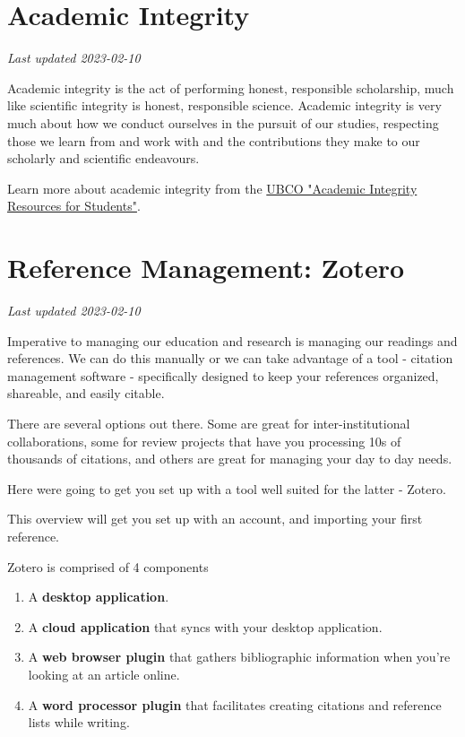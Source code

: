 \documentclass[
]{book}
\providecommand{\tightlist}{%
  \setlength{\itemsep}{0pt}\setlength{\parskip}{0pt}}
\begin{document}
\hypertarget{academic-integrity}{%
\chapter{Academic Integrity}\label{academic-integrity}}

\emph{Last updated 2023-02-10}

Academic integrity is the act of performing honest, responsible scholarship, much like scientific integrity is honest, responsible science. Academic integrity is very much about how we conduct ourselves in the pursuit of our studies, respecting those we learn from and work with and the contributions they make to our scholarly and scientific endeavours.

Learn more about academic integrity from the \href{https://students.ok.ubc.ca/academic-success/learning-hub/online-resources/academic-integrity/}{UBCO "Academic Integrity Resources for Students"}.

\hypertarget{reference-management-zotero}{%
\chapter{Reference Management: Zotero}\label{reference-management-zotero}}

\emph{Last updated 2023-02-10}

Imperative to managing our education and research is managing our readings and references. We can do this manually or we can take advantage of a tool - citation management software - specifically designed to keep your references organized, shareable, and easily citable.

There are several options out there. Some are great for inter-institutional collaborations, some for review projects that have you processing 10s of thousands of citations, and others are great for managing your day to day needs.

Here we\textquotesingle re going to get you set up with a tool well suited for the latter - Zotero.

This overview will get you set up with an account, and importing your first reference.

Zotero is comprised of 4 components

\begin{enumerate}
\def\labelenumi{\arabic{enumi}.}
\tightlist
\item
  A \textbf{desktop application}.
\item
  A \textbf{cloud application} that syncs with your desktop application.
\item
  A \textbf{web browser plugin} that gathers bibliographic information when you're looking at an article online.
\item
  A \textbf{word processor plugin} that facilitates creating citations and reference lists while writing.
\end{enumerate}
\end{document}
